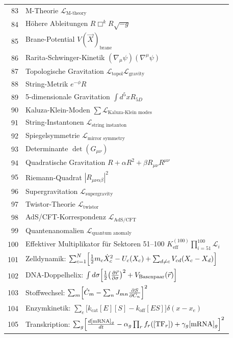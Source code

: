 \documentclass[11pt,a4paper]{article}
\begin{document}
\begin{longtable}{r l}
		83 & M-Theorie \(\mathcal{L}_{\text{M‑theory}}\) \\
		84 & Höhere Ableitungen \(R\Box^k R\sqrt{-g}\) \\
		85 & Brane-Potential \(V(\vec{X})_{\text{brane}}\) \\
		86 & Rarita-Schwinger-Kinetik \((\nabla_\mu\psi)(\nabla^\mu\psi)\) \\
		87 & Topologische Gravitation \(\mathcal{L}_{\text{topol}}\mathcal{L}_{\text{gravity}}\) \\
		88 & String-Metrik \(e^{-\phi}R\) \\
		89 & 5-dimensionale Gravitation \(\int d^5x R_{5D}\) \\
		90 & Kaluza-Klein-Moden \(\sum\mathcal{L}_{\text{Kaluza‑Klein modes}}\) \\
		91 & String-Instantonen \(\mathcal{L}_{\text{string instanton}}\) \\
		92 & Spiegelsymmetrie \(\mathcal{L}_{\text{mirror symmetry}}\) \\
		93 & Determinante \(\det(G_{\mu\nu})\) \\
		94 & Quadratische Gravitation \(R + \alpha R^2 + \beta R_{\mu\nu}R^{\mu\nu}\) \\
		95 & Riemann-Quadrat \(|R_{\mu\nu\alpha\beta}|^2\) \\
		96 & Supergravitation \(\mathcal{L}_{\text{supergravity}}\) \\
		97 & Twistor-Theorie \(\mathcal{L}_{\text{twistor}}\) \\
		98 & AdS/CFT-Korrespondenz \(\mathcal{L}_{\text{AdS/CFT}}\) \\
		99 & Quantenanomalien \(\mathcal{L}_{\text{quantum anomaly}}\) \\
		100 & Effektiver Multiplikator für Sektoren 51–100 \(K^{(100)}_{\mathrm{eff}}\prod_{i=51}^{100}\mathcal{L}_i\) \\
		        101 & Zelldynamik: $\sum_{c=1}^{N}\Bigl[\frac12 m_c\dot X_c^2 - U_c(X_c) + \sum_{d\neq c}V_{cd}(X_c-X_d)\Bigr]$ \\
		102 & DNA-Doppelhelix: $\int d\sigma\Bigl[\frac12\bigl(\frac{\partial\vec r}{\partial\sigma}\bigr)^2 + V_{\text{Basenpaar}}(\vec r)\Bigr]$ \\
		103 & Stoffwechsel: $\sum_m\Bigl[\dot C_m - \sum_n J_{mn}\frac{\partial S}{\partial C_n}\Bigr]^2$ \\
		104 & Enzymkinetik: $\sum_e\bigl[k_{\text{cat}}[E][S] - k_{\text{off}}[ES]\bigr]\delta(x-x_e)$ \\
		105 & Transkription: $\sum_g\Bigl[\frac{d[\text{mRNA}]_g}{dt} - \alpha_g\prod_r f_r([\text{TF}_r]) + \gamma_g[\text{mRNA}]_g\Bigr]^2$ \\

\end{longtable}
\end{document}
